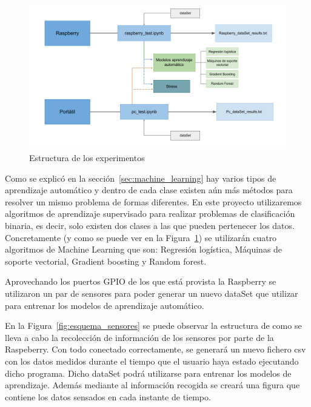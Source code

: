 \documentclass[a4paper, 12pt]{book}
\begin{document}
\begin{figure}[h!]
  \centering
  \includegraphics[width=14cm, keepaspectratio]{img/arquitectura_general.png}
  \caption{Estructura de los experimentos}\label{fig:arquitectura}
\end{figure}

Como se explicó en la sección~\ref{sec:machine_learning} hay varios tipos de aprendizaje automático y dentro de cada clase existen aún más métodos para resolver un mismo problema de formas diferentes. En este proyecto utilizaremos algoritmos de aprendizaje supervisado para realizar problemas de clasificación binaria, es decir, solo existen dos clases a las que pueden pertenecer los datos. Concretamente (y como se puede ver en la Figura~\ref{fig:arquitectura}) se utilizarán cuatro algoritmos de Machine Learning que son: Regresión logística, Máquinas de soporte vectorial, Gradient boosting y Random forest.

Aprovechando los puertos GPIO de los que está provista la Raspberry se utilizaron un par de sensores para poder generar un nuevo dataSet que utilizar para entrenar los modelos de aprendizaje automático.

En la Figura~\ref{fig:esquema_sensores} se puede observar la estructura de como se lleva a cabo la recolección de información de los sensores por parte de la Raspeberry. Con todo conectado correctamente, se generará un nuevo fichero csv con los datos medidos durante el tiempo que el usuario haya estado ejecutando dicho programa. Dicho dataSet podrá utilizarse para entrenar los modelos de aprendizaje. Además mediante al información recogida se creará una figura que contiene los datos sensados en cada instante de tiempo.
\end{document}
